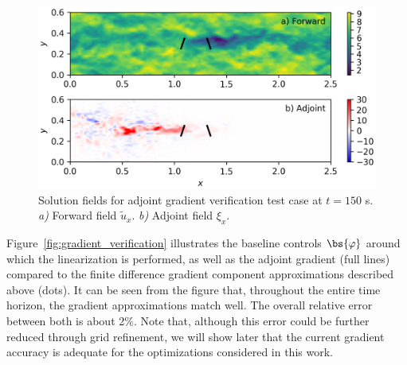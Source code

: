 	\begin{figure}[t]
		\includegraphics[width=\textwidth]{chapters/optimal_control_problem/forward_v_adjoint.eps}
	\caption[Solution fields for adjoint gradient verification test case at $t=150$ s.]{Solution fields for adjoint gradient verification test case at $t=150$ s. \emph{a)} Forward field $\tilde{u}_x$. \emph{b)} Adjoint field $\xi_x$. \label{fig:forwardfield_adjointfield}}
	\end{figure}

	Figure~\ref{fig:gradient_verification} illustrates the baseline controls $\bs{\varphi}$ around which the linearization is performed, as well as the adjoint gradient (full lines) compared to the finite difference gradient component approximations described above (dots). It can be seen from the figure that, throughout the entire time horizon, the gradient approximations match well. The overall relative error between both is about 2$\%$. Note that, although this error could be further reduced through grid refinement, we will show later that the current gradient accuracy is adequate for the optimizations considered in this work.
	
